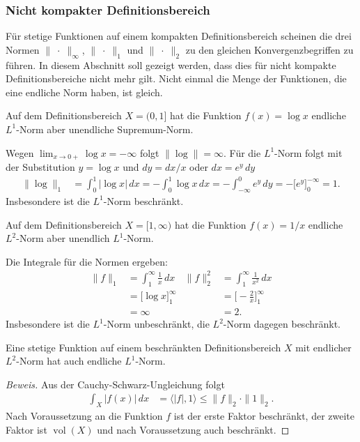 %
%
\subsubsection{Nicht kompakter Definitionsbereich}
Für stetige Funktionen auf einem kompakten Definitionsbereich scheinen
die drei Normen $\|\;\cdot\;\|_\infty$, $\|\;\cdot\;\|_1$ und
$\|\;\cdot\;\|_2$ zu den gleichen Konvergenzbegriffen zu führen.
In diesem Abschnitt soll gezeigt werden, dass dies für nicht kompakte
Definitionsbereiche nicht mehr gilt.
Nicht einmal die Menge der Funktionen, die eine endliche Norm haben,
ist gleich.

\begin{beispiel}
Auf dem Definitionsbereich $X=(0,1]$ hat die Funktion
$f(x)=\log x$ endliche $L^1$-Norm aber unendliche Supremum-Norm.

\medskip
\noindent
Wegen $\lim_{x\to 0+}\log x = -\infty$ folgt $\|\log\|=\infty$.
Für die $L^1$-Norm folgt mit der Substitution $y=\log x$ und
$dy = dx/x$ oder $dx = e^y\,dy$
\begin{align*}
\|\log\|_1
&=
\int_0^1|\log x|\,dx
=
-\int_0^1\log x\,dx
=
-\int_{-\infty}^0 e^y\,dy
=
-\biggl[ e^y \biggr]_0^{-\infty}
=
1.
\end{align*}
Insbesondere ist die $L^1$-Norm beschränkt.
\end{beispiel}

\begin{beispiel}
Auf dem Definitionsbereich $X=[1,\infty)$ hat die Funktion
$f(x)=1/x$ endliche $L^2$-Norm aber unendlich $L^1$-Norm.

\medskip
\noindent
Die Integrale für die Normen ergeben:
\begin{align*}
\|f\|_1
&=
\int_1^\infty \frac{1}{x}\,dx
&
\|f\|_2^2
&=
\int_1^\infty \frac{1}{x^2}\,dx
\\
&=\biggl[\log x\biggr]_1^\infty
&
&=\biggl[-\frac{2}{x}\biggr]_1^\infty
\\
&=\infty
&
&=2.
\end{align*}
Insbesondere ist die $L^1$-Norm unbeschränkt, die $L^2$-Norm dagegen
beschränkt.
\end{beispiel}

\begin{satz}
Eine stetige Funktion auf einem beschränkten Definitionsbereich $X$
mit endlicher $L^2$-Norm hat auch endliche $L^1$-Norm.
\end{satz}

\begin{proof}[Beweis]
Aus der Cauchy-Schwarz-Ungleichung folgt
\begin{align*}
\int_X |f(x)|\,dx
&=
\langle |f|, 1\rangle
\le
\|f\|_2\cdot \|1\|_2.
\end{align*}
Nach Voraussetzung an die Funktion $f$ ist der erste Faktor beschränkt,
der zweite Faktor ist $\operatorname{vol}(X)$ und nach Voraussetzung
auch beschränkt.
\end{proof}

